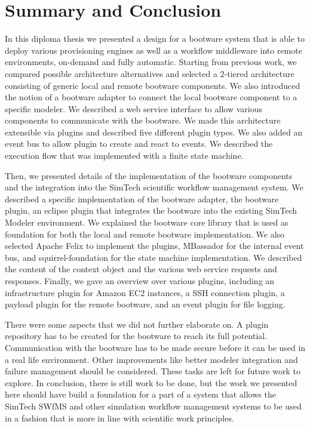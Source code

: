 \chapter{Summary and Conclusion}
\label{conclusion}

In this diploma thesis we presented a design for a bootware system that is able to deploy various provisioning engines as well as a workflow middleware into remote environments, on-demand and fully automatic.
Starting from previous work, we compared possible architecture alternatives and selected a 2-tiered architecture consisting of generic local and remote bootware components.
We also introduced the notion of a bootware adapter to connect the local bootware component to a specific modeler.
We described a web service interface to allow various components to communicate with the bootware.
We made this architecture extensible via plugins and described five different plugin types.
We also added an event bus to allow plugin to create and react to events.
We described the execution flow that was implemented with a finite state machine.

Then, we presented details of the implementation of the bootware components and the integration into the SimTech scientific workflow management system.
We described a specific implementation of the bootware adapter, the bootware plugin, an eclipse plugin that integrates the bootware into the existing SimTech Modeler environment.
We explained the bootware core library that is used as foundation for both the local and remote bootware implementation.
We also selected Apache Felix to implement the plugins, MBassador for the internal event bus, and squirrel-foundation for the state machine implementation.
We described the content of the context object and the various web service requests and responses.
Finally, we gave an overview over various plugins, including an infrastructure plugin for Amazon EC2 instances, a SSH connection plugin, a payload plugin for the remote bootware, and an event plugin for file logging.

There were some aspects that we did not further elaborate on.
A plugin repository has to be created for the bootware to reach its full potential.
Communication with the bootware has to be made secure before it can be used in a real life environment.
Other improvements like better modeler integration and failure management should be considered.
These tasks are left for future work to explore.
In conclusion, there is still work to be done, but the work we presented here should have build a foundation for a part of a system that allows the SimTech SWfMS and other simulation workflow management systems to be used in a fashion that is more in line with scientific work principles.
